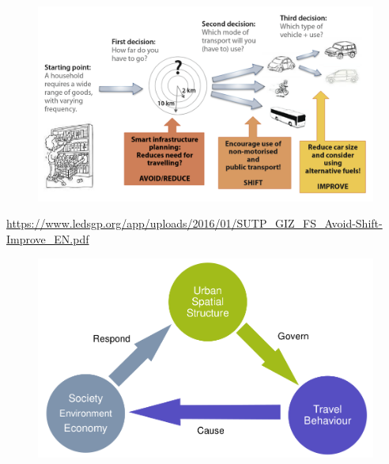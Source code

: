 \documentclass[aspectratio=169]{beamer}
\begin{document}
\begin{frame}
	
	\begin{figure}
		
		\includegraphics[width=0.94\linewidth]{images/avoidshiftimprove.png}
	\end{figure}

	\tiny\url{https://www.ledsgp.org/app/uploads/2016/01/SUTP_GIZ_FS_Avoid-Shift-Improve_EN.pdf}
	
\end{frame}



\begin{frame}
	
	\begin{figure}
		
		\includegraphics[width=0.94\linewidth]{images/big_links.png}
	\end{figure}
	
\end{frame}
\end{document}

